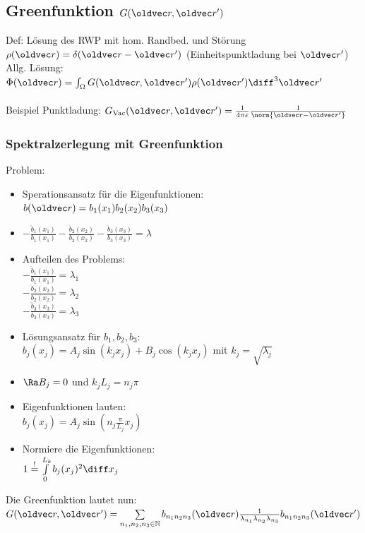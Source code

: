 \documentclass[6pt,a4paper]{scrartcl}
\let\vec\oldvec
\begin{document}
\begin{multicols}{4}
	
	
	\subsection{Greenfunktion $G(\vec r, \vec r')$}
	Def: Lösung des RWP mit hom. Randbed. und Störung $\rho(\vec r) = \delta(\vec r - \vec r')$ (Einheitspunktladung bei $\vec r'$)\\
	Allg. Lösung: $\Phi(\vec r) = \int_\Omega G(\vec r, \vec r')\rho(\vec r') \diff^3 \vec r'$\\
	\\
	Beispiel Punktladung: $G_{\text{Vac}}(\vec r, \vec r') = \frac{1}{4 \pi \varepsilon} \frac{1}{\norm{\vec r - \vec r'}}$
	
	\subsubsection*{Spektralzerlegung mit Greenfunktion}
	Problem: 

	\begin{itemize}
		\item Sperationsansatz für die Eigenfunktionen: \\
		$b(\vec r) = b_1 (x_1) b_2(x_2) b_3(x_3)$
		\item $- \frac{\ddot b_1(x_1)}{b_1 (x_1)} - \frac{\ddot b_2(x_2)}{b_2 (x_2)}  - \frac{\ddot b_3(x_3)}{b_3 (x_3)} = \lambda$
		\item Aufteilen des Problems: \\
		$- \frac{\ddot b_1(x_1)}{b_1 (x_1)} = \lambda_1$ \\
		$- \frac{\ddot b_2(x_2)}{b_2 (x_2)} = \lambda_2$ \\
		$- \frac{\ddot b_3(x_3)}{b_3 (x_3)} = \lambda_3$
		\item Lösungsansatz für $b_1, b_2, b_3$: \\
		$b_j (x_j) = A_j \sin(k_j x_j) + B_j \cos (k_j x_j)$ mit $k_j = \sqrt{\lambda_j}$
		\item $\Ra B_j = 0$ und $k_j L_j = n_j \pi$
		\item Eigenfunktionen lauten: \\
		$b_j ( x_j ) = A_j \sin (n_j \frac{\pi}{L_j} x_j)$
		\item Normiere die Eigenfunktionen: \\
			$1 \overset{!}{=} \int \limits_0^{L_k} b_j (x_j)^2 \diff x_j$
	\end{itemize}
	
	Die Greenfunktion lautet nun: \\
	$G(\vec r, \vec r') = \sum \limits_{n_1, n_2 , n_3 \in \mathbb N} b_{n_1 n_2 n_3} (\vec r ) \frac{1}{\lambda_{n_1}\lambda_{n_2}\lambda_{n_3}} b_{n_1 n_2 n_3} (\vec r' )$
	

\end{multicols}
\end{document}
